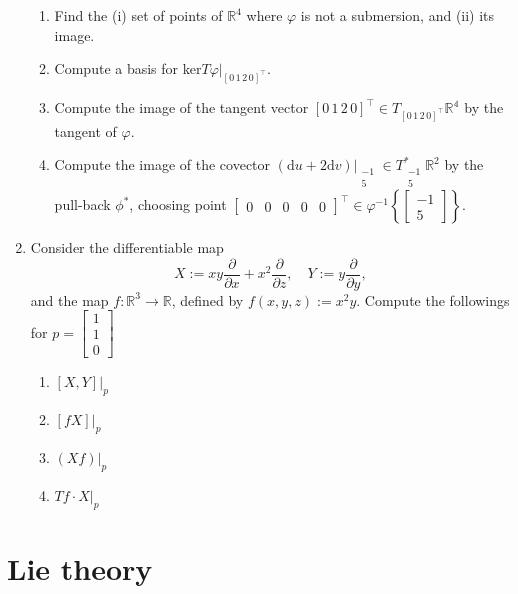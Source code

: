 \documentclass{article}
\begin{document}
\begin{enumerate}[start=19]
  \begin{enumerate}
    \item Find the (i) set of points of $\mathbb{R}^{4}$ where $\varphi$ is not a submersion, and (ii) its image.
    \item Compute a basis for ker$T\varphi\Big|_{[0\,1\,2\,0]^{\top}}$.
    \item Compute the image of the tangent vector $[0\,1\,2\,0]^{\top}\in T_{[0\,1\,2\,0]^{\top}}\mathbb{R^{4}}$ by the tangent of $\varphi$.
    \item Compute the image of the covector $(\text{d}u+2\text{d}v)\Big|_{\begin{smallmatrix}-1\\5\end{smallmatrix}}\in T^{*}_{\begin{smallmatrix}-1\\5\end{smallmatrix}}\mathbb{R}^{2}$ by the pull-back $\phi^{*}$, choosing point $\begin{bmatrix}0&0&0&0&0\end{bmatrix}^{\top}\in\varphi^{-1}\left\{\begin{bmatrix}-1\\5\end{bmatrix}\right\}.$
  \end{enumerate}

  \item Consider the differentiable map
  $$
  X:=xy\frac{\partial}{\partial x}+x^{2}\frac{\partial}{\partial z},\quad Y:=y\frac{\partial}{\partial y},
  $$
  and the map $f:\mathbb{R}^{3}\rightarrow\mathbb{R}$, defined by $f(x,y,z):=x^{2}y$. Compute the followings for $p=\begin{bmatrix}1\\1\\0\end{bmatrix}$

  \begin{enumerate}
    \item $[X,Y]\Big|_{p}$
    \item $[fX]\Big|_{p}$
    \item $(Xf)\Big|_{p}$
    \item $Tf\cdot X|_{p}$
  \end{enumerate}


\end{enumerate}

\section{Lie theory}
\end{document}
